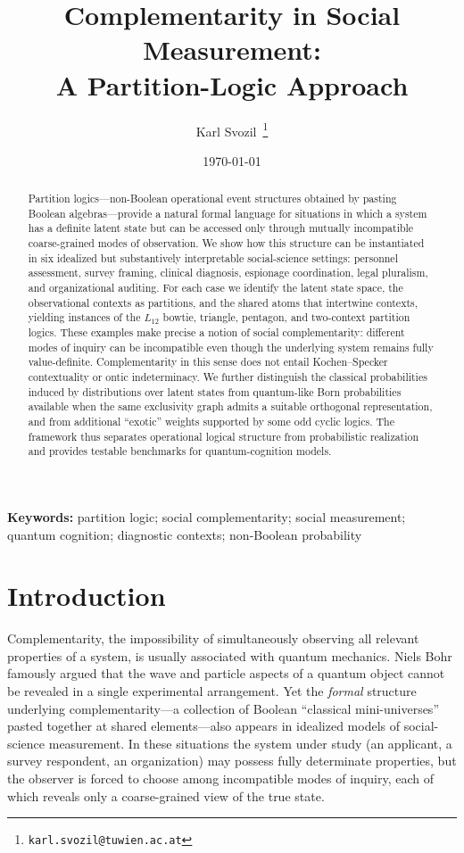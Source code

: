 \documentclass{article}
\title{Complementarity in Social Measurement:\\ A Partition-Logic Approach}
\author{Karl Svozil\,\orcidlink{0000-0001-6554-2802}%
  \thanks{\texttt{karl.svozil@tuwien.ac.at}}}
\affil{Institute for Theoretical Physics, TU Wien,
      Wiedner Hauptstrasse 8-10/136, A-1040 Vienna, Austria}
\date{\today}
\begin{document}
\maketitle

\begin{abstract}
Partition logics---non-Boolean operational event structures obtained by pasting Boolean algebras---provide a natural formal language for situations in which a system has a definite latent state but can be accessed only through mutually incompatible coarse-grained modes of observation. We show how this structure can be instantiated in six idealized but substantively interpretable social-science settings: personnel assessment, survey framing, clinical diagnosis, espionage coordination, legal pluralism, and organizational auditing. For each case we identify the latent state space, the observational contexts as partitions, and the shared atoms that intertwine contexts, yielding instances of the $L_{12}$ bowtie, triangle, pentagon, and two-context partition logics. These examples make precise a notion of social complementarity: different modes of inquiry can be incompatible even though the underlying system remains fully value-definite. Complementarity in this sense does not entail Kochen--Specker contextuality or ontic indeterminacy. We further distinguish the classical probabilities induced by distributions over latent states from quantum-like Born probabilities available when the same exclusivity graph admits a suitable orthogonal representation, and from additional ``exotic'' weights supported by some odd cyclic logics. The framework thus separates operational logical structure from probabilistic realization and provides testable benchmarks for quantum-cognition models.
\end{abstract}

\noindent\textbf{Keywords:}
partition logic; social complementarity; social measurement; quantum cognition; diagnostic contexts; non-Boolean probability

\section{Introduction}
\label{sec:intro}

Complementarity, the impossibility of simultaneously observing all
relevant properties of a system, is usually associated with quantum
mechanics. Niels Bohr famously argued that the wave and particle
aspects of a quantum object cannot be revealed in a single
experimental arrangement. Yet the \emph{formal} structure underlying
complementarity---a collection of Boolean ``classical mini-universes''
pasted together at shared elements---also appears in idealized
models of social-science measurement. In these situations the system
under study (an applicant, a survey respondent, an organization)
may possess fully determinate properties, but the observer is forced
to choose among incompatible modes of inquiry, each of which reveals
only a coarse-grained view of the true state.
\end{document}
